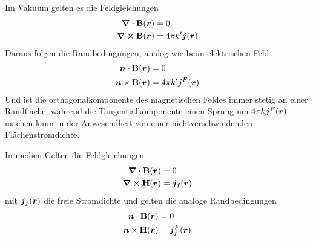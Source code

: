 Im Vakuum gelten es die Feldgleichungen
\begin{equation}
  \begin{split}
    \div \vb B(\vb*r) &= 0\\
    \curl \vb B(\vb*r) &= 4\pi k' \vb*j(\vb*r)
  \end{split}
\end{equation}
Daraus folgen die Randbedingungen, analog wie beim elektrischen Feld
\begin{equation}
  \begin{split}
    \vb*n\cdot \vb B(\vb*r) &= 0\\
    \vb*n\times \vb B(\vb*r) &= 4\pi k'\vb*j^F(\vb*r)\\
  \end{split}
\end{equation}
Und ist die orthogonalkomponente des magnetischen Feldes immer stetig an einer Randfläche, während die Tangentialkomponente einen Sprung um $4\pi k\vb*j^F(\vb*r)$ machen kann in der Anwesendheit von einer nichtverschwindenden Flächenstromdichte.

In medien Gelten die Feldgleichungen
\begin{equation}
  \begin{split}
    \div \vb B(\vb*r) &= 0\\
    \curl \vb H(\vb*r) &= \vb*j_f(\vb*r)
  \end{split}
\end{equation}
mit $\vb*j_f(\vb*r)$ die freie Stromdichte und gelten die analoge Randbedingungen
\begin{equation*}
  \begin{split}
    \vb*n\cdot \vb B(\vb*r) &= 0\\
    \vb*n\times \vb H(\vb*r) &= \vb*j_f^F(\vb*r)\\
  \end{split}
\end{equation*}
